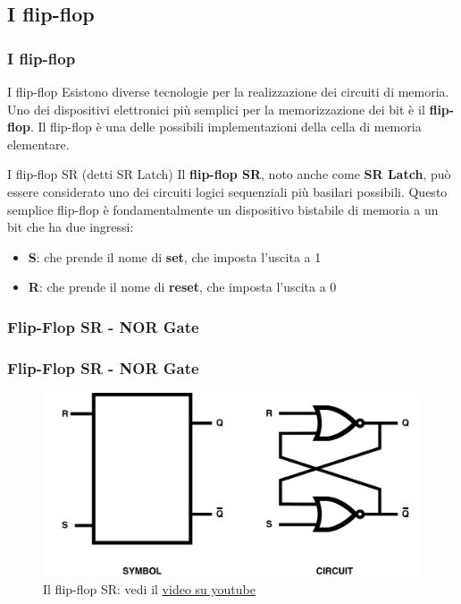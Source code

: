 \subsection[I flip-flop]{I flip-flop}
\begin{frame}
	\frametitle{I flip-flop}
	
	\begin{block}{I flip-flop}
		Esistono diverse tecnologie per la realizzazione dei circuiti di memoria. Uno dei dispositivi elettronici più semplici per la memorizzazione dei bit è il \textbf{flip-flop}. Il flip-flop è una delle possibili implementazioni della cella di memoria elementare.		
	\end{block}
	
	\begin{block}{I flip-flop SR (detti SR Latch)}
		Il \textbf{flip-flop SR}, noto anche come \textbf{SR Latch}, può essere considerato uno dei circuiti logici sequenziali più basilari possibili. Questo semplice flip-flop è fondamentalmente un dispositivo bistabile di memoria a un bit che ha due ingressi:
		\begin{itemize}
			\item \textbf{S}: che prende il nome di \textbf{set}, che imposta l'uscita a 1
			\item \textbf{R}: che prende il nome di \textbf{reset}, che imposta l'uscita a 0
		\end{itemize}
	\end{block}
	
\end{frame}


\subsubsection[Flip-Flop SR - NOR Gate]{Flip-Flop SR - NOR Gate}
\begin{frame}
	\frametitle{Flip-Flop SR - NOR Gate}
	 
	\begin{figure}[!htbp] 
		\centering
		\includegraphics[width=0.95\linewidth]{images/5_memory/flip_flop_sr_nor.pdf}
		\caption{Il flip-flop SR: vedi il \underline{\hyperlink{https://www.youtube.com/watch?v=br2pbjAnP2k&authuser=1}{video su youtube}}}
	\end{figure}
	
\end{frame}

